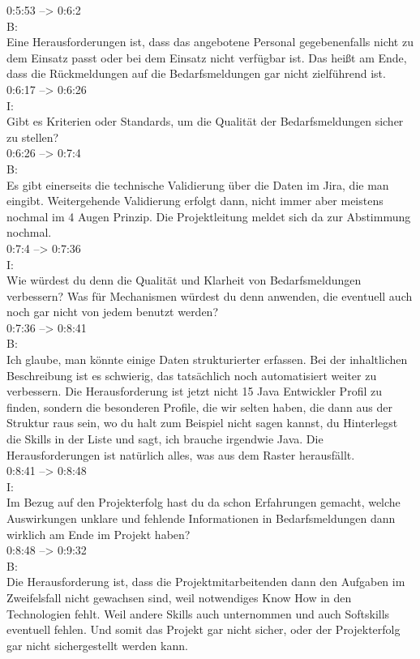0:5:53 --> 0:6:2\\
B:\\
Eine Herausforderungen ist, dass das angebotene Personal gegebenenfalls nicht zu dem Einsatz passt oder bei dem Einsatz nicht verfügbar ist. Das heißt am Ende, dass die Rückmeldungen auf die Bedarfsmeldungen gar nicht zielführend ist.\\

0:6:17 --> 0:6:26\\
I:\\
Gibt es Kriterien oder Standards, um die Qualität der Bedarfsmeldungen sicher zu stellen?\\

0:6:26 --> 0:7:4\\
B:\\
Es gibt einerseits die technische Validierung über die Daten im Jira, die man eingibt. Weitergehende Validierung erfolgt dann, nicht immer aber meistens nochmal im 4 Augen Prinzip. Die Projektleitung meldet sich da zur Abstimmung nochmal.\\

0:7:4 --> 0:7:36\\
I:\\
Wie würdest du denn die Qualität und Klarheit von Bedarfsmeldungen verbessern? Was für Mechanismen würdest du denn anwenden, die eventuell auch noch gar nicht von jedem benutzt werden?\\

0:7:36 --> 0:8:41\\
B:\\
Ich glaube, man könnte einige Daten strukturierter erfassen. Bei der inhaltlichen Beschreibung ist es schwierig, das tatsächlich noch automatisiert weiter zu verbessern. Die Herausforderung ist jetzt nicht 15 Java Entwickler Profil zu finden, sondern die besonderen Profile, die wir selten haben, die dann aus der Struktur raus sein, wo du halt zum Beispiel nicht sagen kannst, du Hinterlegst die Skills in der Liste und sagt, ich brauche irgendwie Java. Die Herausforderungen ist natürlich alles, was aus dem Raster herausfällt.\\

0:8:41 --> 0:8:48\\
I:\\
Im Bezug auf den Projekterfolg hast du da schon Erfahrungen gemacht, welche Auswirkungen unklare und fehlende Informationen in Bedarfsmeldungen dann wirklich am Ende im Projekt haben?\\

0:8:48 --> 0:9:32\\
B:\\
Die Herausforderung ist, dass die Projektmitarbeitenden dann den Aufgaben im Zweifelsfall nicht gewachsen sind, weil notwendiges Know How in den Technologien fehlt. Weil andere Skills auch unternommen und auch Softskills eventuell fehlen. Und somit das Projekt gar nicht sicher, oder der Projekterfolg gar nicht sichergestellt werden kann.\\

